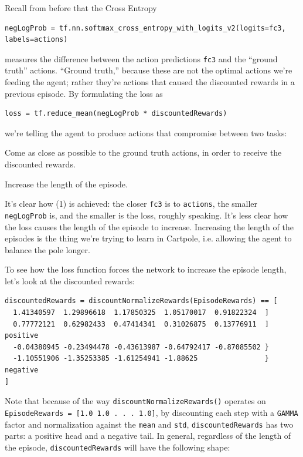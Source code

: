 \documentclass[20pt]{extarticle}
\let\oldBeginEnumerate=\enumerate
\let\oldEndEnumerate=\endenumerate
\renewenvironment{enumerate}{
\oldBeginEnumerate
  \setlength{\itemsep}{0pt}
  \setlength{\parskip}{0pt}
  \setlength{\parsep}{0pt}
}{\oldEndEnumerate}
\theoremstyle{plain}
\theoremstyle{definition}
\theoremstyle{remark}
\newcommand{\0}{\varnothing}
\newcommand{\<}{\langle}
\renewcommand{\>}{\rangle}
\begin{document}
Recall from before that the Cross Entropy

\tiny
\begin{lstlisting}
negLogProb = tf.nn.softmax_cross_entropy_with_logits_v2(logits=fc3, labels=actions)
\end{lstlisting}
\normalsize
measures the difference between the action predictions \lstinline{fc3} and the ``ground truth'' actions. ``Ground truth,'' because these are not the optimal actions we're feeding the agent; rather they're actions that caused the discounted rewards in a previous episode. By formulating the loss as

\footnotesize
\begin{lstlisting}
loss = tf.reduce_mean(negLogProb * discountedRewards)
\end{lstlisting}
\normalsize
we're telling the agent to produce actions that compromise between two tasks:

\begin{enumerate}
  \item Come as close as possible to the ground truth actions, in order to receive the discounted rewards.
  \item Increase the length of the episode.
\end{enumerate}

It's clear how (1) is achieved: the closer \lstinline{fc3} is to \lstinline{actions}, the smaller \lstinline{negLogProb} is, and the smaller is the loss, roughly speaking. It's less clear how the loss causes the length of the episode to increase. Increasing the length of the episodes is the thing we're trying to learn in Cartpole, i.e. allowing the agent to balance the pole longer.

To see how the loss function forces the network to increase the episode length, let's look at the discounted rewards:

\tiny
\begin{lstlisting}
discountedRewards = discountNormalizeRewards(EpisodeRewards) == [
  1.41340597  1.29896618  1.17850325  1.05170017  0.91822324  ]
  0.77772121  0.62982433  0.47414341  0.31026875  0.13776911  ] positive
  -0.04380945 -0.23494478 -0.43613987 -0.64792417 -0.87085502 }
  -1.10551906 -1.35253385 -1.61254941 -1.88625                } negative
]
\end{lstlisting}
\normalsize
Note that because of the way \lstinline{discountNormalizeRewards()} operates on \lstinline{EpisodeRewards = [1.0 1.0 . . . 1.0]}, by discounting each step with a \lstinline{GAMMA} factor and normalization against the \lstinline{mean} and \lstinline{std}, \lstinline{discountedRewards} has two parts: a positive head and a negative tail. In general, regardless of the length of the episode, \lstinline{discountedRewards} will have the following shape:
\end{document}
